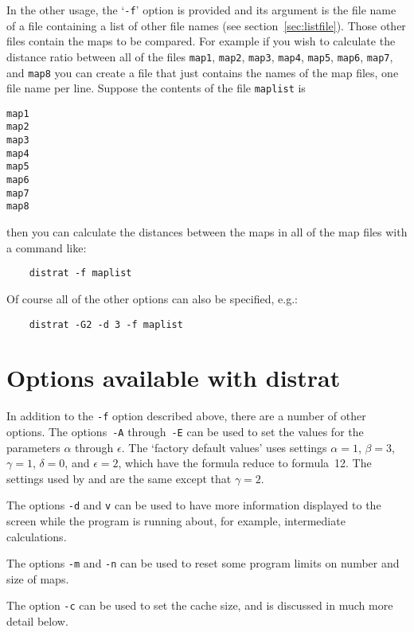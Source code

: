 \documentclass[%
	11pt,
        a4paper,
        twoside]{workrep}
\newcommand*{\prg}[1]{\textsf{#1}}		%
\newcommand*{\file}[1]{\texttt{#1}}		%
\newcommand*{\opt}[1]{\texttt{#1}}		%
\begin{document}
In the other usage, the `\texttt{-f}' option is provided and
its argument is the file name of a file containing a list of other
file names (see section~\ref{sec:listfile}).
Those other files contain the maps to be compared.  For
example if you wish to calculate the distance ratio between all of
the files \file{map1}, \file{map2}, \file{map3}, \file{map4},
\file{map5}, \file{map6}, \file{map7}, and
\file{map8} you can create a file that just contains the names of the map
files, one file name per line.  Suppose the contents of the file
\file{maplist} is
\begin{verbatim}
map1
map2
map3
map4
map5
map6
map7
map8
\end{verbatim}
then you can calculate the distances between the maps in all
of the map files with a command like:
\begin{verbatim}
    distrat -f maplist
\end{verbatim}
Of course all of the other options can also be specified, e.g.:
\begin{verbatim}
    distrat -G2 -d 3 -f maplist
\end{verbatim}

\section{Options available with \prg{distrat}}\label{sec:dropts}

In addition to the \opt{-f} option described above, there are a number
of other options.  The options~\opt{-A} through~\opt{-E} can be used
to set the values for the parameters $\alpha$ through $\epsilon$.  The
`factory default values' uses settings $\alpha=1$, $\beta=3$, $\gamma=1$,
$\delta=0$, and $\epsilon=2$, which have the formula reduce to
 formula~12.  The settings used by
 and  are
the same except that $\gamma=2$.

The options \opt{-d} and \opt{v} can be used to have more information
displayed to the screen while the program is running about, for example,
intermediate calculations.

The options \opt{-m} and \opt{-n} can be used to reset some program
limits on number and size of maps.

The option \opt{-c} can be used to set the cache size, and is discussed
in much more  detail below.
\end{document}
